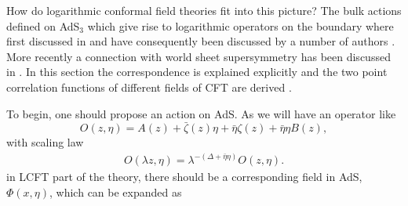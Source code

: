 \documentclass[a4paper,11pt]{article}
\begin{document}
How do logarithmic conformal field theories fit into this
picture? The bulk actions defined on AdS$_{3}$ which give rise to
logarithmic operators on the boundary where first discussed in
\cite{khor,iko} and have consequently been discussed by a number
of authors \cite{lewis,myu}. More recently a connection with world
sheet supersymmetry has been discussed in \cite{pol}. In this
section the correspondence is explained explicitly and the two
point correlation functions of different fields of CFT are
derived \cite{rou}.

 To begin, one should propose an action on AdS. As we will have an
operator like
\begin{equation} \label{eq:a115}
O(z,\eta)= A(z) +\bar{\zeta}(z) \eta +\bar{\eta} \zeta(z) +
\bar{\eta} \eta B(z),
\end{equation}
with scaling law
\begin{eqnarray}\label{eq:a116}
O(\lambda z,\eta)=\lambda^{-(\Delta+\bar{\eta}\eta)} O(z,\eta) .
\end{eqnarray}
in LCFT part of the theory, there should be a corresponding field
in AdS, $\Phi(x,\eta)$, which can be expanded as
\end{document}
